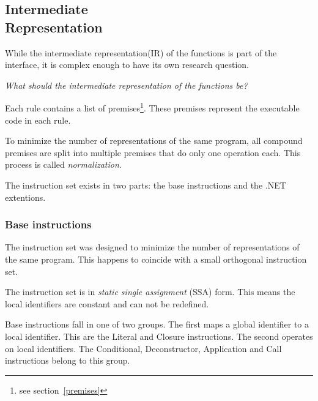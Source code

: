 \subsection[Intermediate Representation]{Intermediate\\Representation}\label{ir}
While the intermediate representation(IR) of the functions is part of the interface, it is complex enough to have its own research question.

\textit{What should the intermediate representation of the functions be?}

Each rule contains a list of premises\footnote{see section~\ref{premises}}.
These premises represent the executable code in each rule.

To minimize the number of representations of the same program, all compound premises are split into multiple premises that do only one operation each.
This process is called \textit{normalization}\label{normalization}.

The instruction set exists in two parts: the base instructions and the .NET extentions.

\subsubsection{Base instructions}
The instruction set was designed to minimize the number of representations of the same program.
This happens to coincide with a small orthogonal instruction set.

The instruction set is in \textit{static single assignment} (SSA) form.
This means the local identifiers are constant and can not be redefined.

Base instructions fall in one of two groups.
The first maps a global identifier to a local identifier.
This are the Literal and Closure instructions.
The second operates on local identifiers.
The Conditional, Deconstructor, Application and Call instructions belong to this group.


